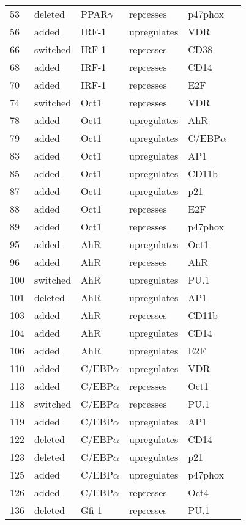 \begin{center}
\begin{scriptsize}
\begin{supertabular}{|p{2 cm}|p{2cm}|p{3cm}|p{2.5cm}|p{2cm}|p{1.5cm}|}
53 &  deleted &  PPAR$\gamma$  & represses & p47phox & \\
56 &  added &  IRF-1  & upregulates &  VDR & \\
66 &  switched &  IRF-1  & represses & CD38 & \\
68 &  added &  IRF-1  & represses & CD14 & \\
70 &  added &  IRF-1  & represses & E2F & \\
74 &  switched &  Oct1  & represses & VDR & \\
78 &  added &  Oct1  & upregulates &  AhR & \\
79 &  added &  Oct1  & upregulates & C/EBP$\alpha$ & \\
83 &  added &  Oct1  & upregulates &  AP1 & \cite{Ullman1993}\\
85 &  added &  Oct1  & upregulates &  CD11b & \\
87 &  added &  Oct1  & upregulates &  p21 & \\
88 &  added &  Oct1  & represses & E2F & \\
89 &  added &  Oct1  & represses & p47phox & \\
95 &  added &  AhR  & upregulates &  Oct1 & \\
96 &  added &  AhR  & represses & AhR & \\
100 &  switched &  AhR  & upregulates &  PU.1 & \\
101 &  deleted &  AhR  & upregulates &  AP1 & \\
103 &  added &  AhR  & represses & CD11b & \\
104 &  added &  AhR  & upregulates &  CD14 & \\
106 &  added &  AhR  & upregulates &  E2F & \cite{Marlowe2004}\\
110 &  added & C/EBP$\alpha$ & upregulates &  VDR & \\
113 &  added & C/EBP$\alpha$ & represses & Oct1 & \\
118 &  switched & C/EBP$\alpha$ & represses & PU.1 & \\
119 &  added & C/EBP$\alpha$ & upregulates &  AP1 & \\
122 &  deleted & C/EBP$\alpha$ & upregulates &  CD14 & \\
123 &  deleted & C/EBP$\alpha$ & upregulates &  p21 & \\
125 &  added & C/EBP$\alpha$ & upregulates &  p47phox & \\
126 &  added & C/EBP$\alpha$ & represses & Oct4 & \\
136 &  deleted &  Gfi-1  & represses & PU.1 & \\

\end{supertabular}
\end{scriptsize}
\end{center}
